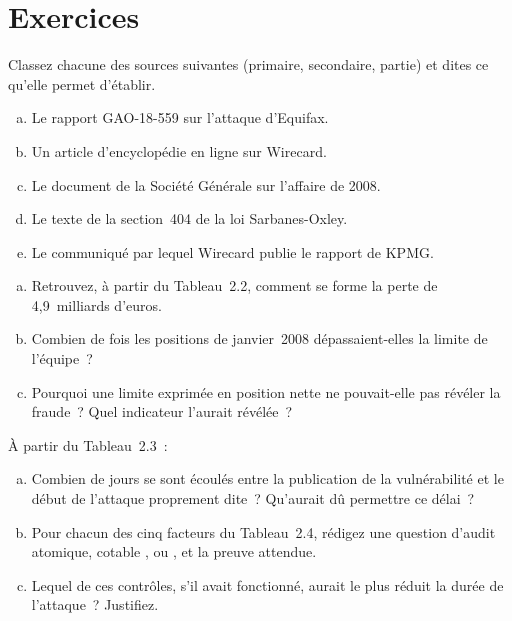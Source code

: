 \section*{Exercices}

\begin{boxexo}[title={\ding{45}\quad Exercice~2.1. Primaire ou secondaire~? \niveaubase}]
Classez chacune des sources suivantes (primaire, secondaire, partie) et
dites ce qu'elle permet d'établir.
\begin{enumerate}[(a)]
    \item Le rapport GAO-18-559 sur l'attaque d'Equifax.
    \item Un article d'encyclopédie en ligne sur Wirecard.
    \item Le document de la Société Générale sur l'affaire de 2008.
    \item Le texte de la section~404 de la loi Sarbanes-Oxley.
    \item Le communiqué par lequel Wirecard publie le rapport de KPMG.
\end{enumerate}
\end{boxexo}

\begin{boxexo}[title={\ding{45}\quad Exercice~2.2. La perte de la Société Générale \niveaubase}]
\begin{enumerate}[(a)]
    \item Retrouvez, à partir du Tableau~2.2, comment se forme la perte de
          4,9~milliards d'euros.
    \item Combien de fois les positions de janvier~2008 dépassaient-elles
          la limite de l'équipe~?
    \item Pourquoi une limite exprimée en position nette ne pouvait-elle
          pas révéler la fraude~? Quel indicateur l'aurait révélée~?
\end{enumerate}
\end{boxexo}

\begin{boxexo}[title={\ding{45}\quad Exercice~2.3. La chronologie d'Equifax \niveaumoyen}]
À partir du Tableau~2.3~:
\begin{enumerate}[(a)]
    \item Combien de jours se sont écoulés entre la publication de la
          vulnérabilité et le début de l'attaque proprement dite~? Qu'aurait
          dû permettre ce délai~?
    \item Pour chacun des cinq facteurs du Tableau~2.4, rédigez une question
          d'audit atomique, cotable \OUI{}, \NON{} ou \NEK{}, et la preuve
          attendue.
    \item Lequel de ces contrôles, s'il avait fonctionné, aurait le plus
          réduit la durée de l'attaque~? Justifiez.
\end{enumerate}
\end{boxexo}

